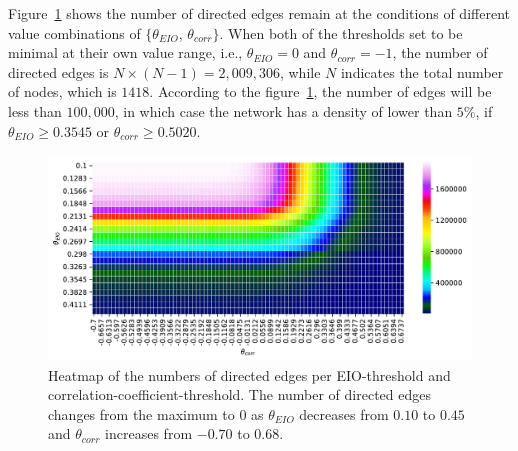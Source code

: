 Figure~\ref{fig:amounts_of_edges_threshold} shows the number of directed edges remain at the conditions of different value combinations of $\{\theta_{EIO}$, $\theta_{corr}\}$. When both of the thresholds set to be minimal at their own value range, i.e., $\theta_{EIO}=0$ and $\theta_{corr}=-1$, the number of directed edges is $N\times(N-1)=2,009,306$, while $N$ indicates the total number of nodes, which is $1418$. According to the figure~\ref{fig:amounts_of_edges_threshold}, the number of edges will be less than $100,000$, in which case the network has a density of lower than $5\%$, if $\theta_{EIO}\geq0.3545$ or $\theta_{corr}\geq0.5020$. 

\begin{figure}
	\begin{center}
		\includegraphics[width=15cm]{amounts_of_edges_threshold}
	\end{center}
	\caption{Heatmap of the numbers of directed edges per EIO-threshold and correlation-coefficient-threshold. The number of directed edges changes from the maximum to $0$ as $\theta_{EIO}$ decreases from $0.10$ to $0.45$ and $\theta_{corr}$ increases from $-0.70$ to $0.68$.}
	\label{fig:amounts_of_edges_threshold}  
\end{figure}

